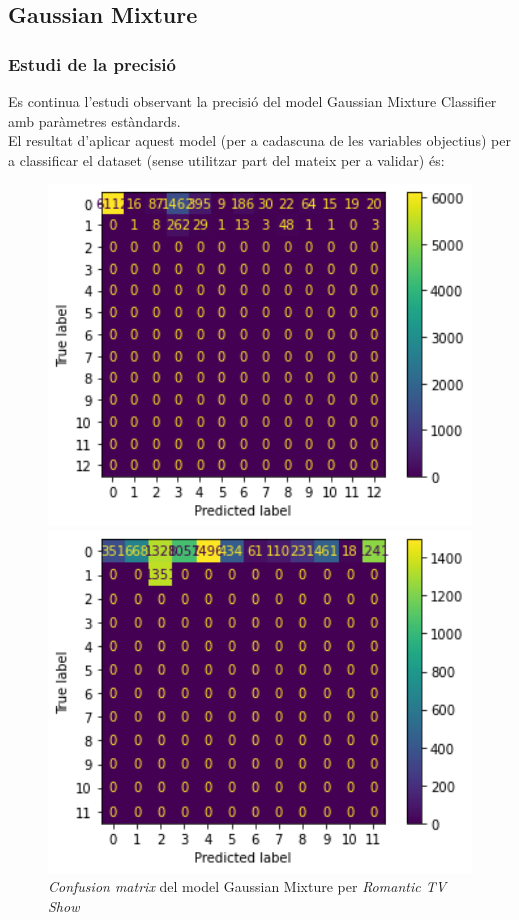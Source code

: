 \documentclass[a4paper, 11pt]{article}
\begin{document}
\newpage


\subsection{Gaussian Mixture}\label{random}
\subsubsection{Estudi de la precisió}
Es continua l'estudi observant la precisió del model Gaussian Mixture Classifier amb paràmetres estàndards.\\
El resultat d'aplicar aquest model (per a cadascuna de les variables objectius) per a classificar el dataset (sense utilitzar part del mateix per a validar) és:
\begin{figure}[h] %
\begin{minipage}{5cm} %
\begin{center}
    \includegraphics[width=1\textwidth]{ConfMatrix/CM_GM_RomanticTV.png}
    \caption{\textit{Confusion matrix} del model Gaussian Mixture per \textit{Romantic TV Show}}
    \includegraphics[width=1\textwidth]{ConfMatrix/CM_GM_InternationalTV.png}

\end{center}
\end{minipage}
\end{figure}
\end{document}
